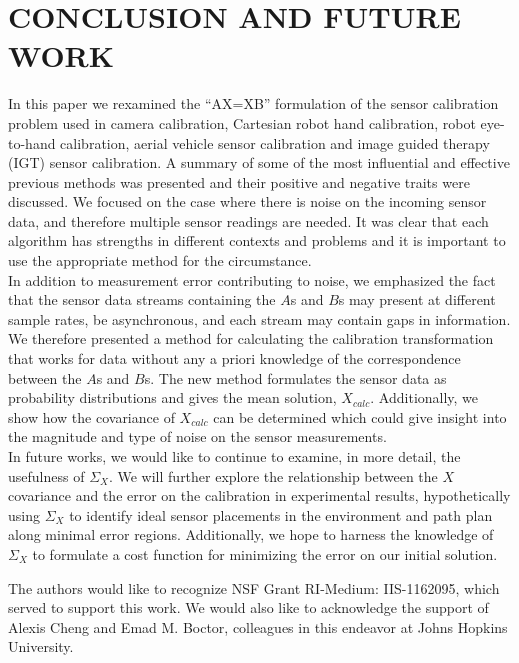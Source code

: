 \documentclass[twocolumn,10pt]{asme2ej}
\begin{document}
\section{CONCLUSION AND FUTURE WORK}
In this paper we rexamined the ``AX=XB'' formulation of the sensor calibration problem used in camera calibration, Cartesian robot hand calibration, robot eye-to-hand calibration, aerial vehicle sensor calibration and image guided therapy (IGT) sensor calibration. A summary of some of the most influential and effective previous methods was presented and their positive and negative traits were discussed. We focused on the case where there is noise on the incoming sensor data, and therefore multiple sensor readings are needed. It was clear that each algorithm has strengths in different contexts and problems and it is important to use the appropriate method for the circumstance.\\
In addition to measurement error contributing to noise, we emphasized the fact that the sensor data streams containing the $A$s and $B$s may present at different sample rates, be asynchronous, and each stream may contain gaps in information. We therefore presented a method for calculating the calibration transformation that works for data without any a priori knowledge of the correspondence between the $A$s and $B$s. The new method formulates the sensor data as probability distributions and gives the mean solution, $X_{calc}$. Additionally, we show how the covariance of $X_{calc}$ can be determined which could give insight into the magnitude and type of noise on the sensor measurements.\\
In future works, we would like to continue to examine, in more detail, the usefulness of $\Sigma_X$. We will further explore the relationship between the $X$ covariance and the error on the calibration in experimental results, hypothetically using $\Sigma_X$ to identify ideal sensor placements in the environment and path plan along minimal error regions. Additionally, we hope to harness the knowledge of $\Sigma_X$ to formulate a cost function for minimizing the error on our initial solution.




\begin{acknowledgment}
The authors would like to recognize NSF Grant RI-Medium: IIS-1162095, which served to support this work. We would also like to acknowledge the support of Alexis Cheng and Emad M. Boctor, colleagues in this endeavor at Johns Hopkins University.
\end{acknowledgment}
\end{document}
